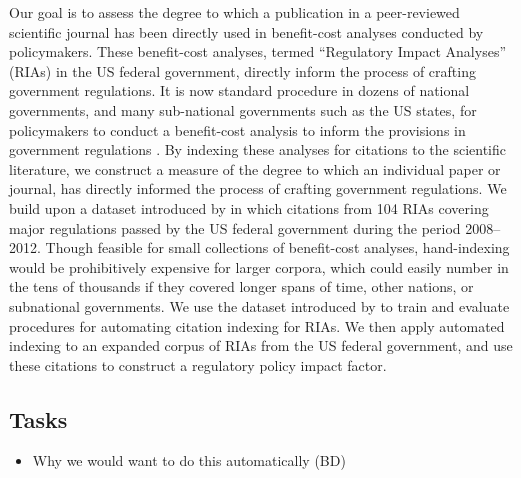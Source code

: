 \documentclass[12pt]{article}
\begin{document}
Our goal is to assess the degree to which a publication in a peer-reviewed scientific journal has been directly used in benefit-cost analyses conducted by policymakers. These benefit-cost analyses, termed ``Regulatory Impact Analyses'' (RIAs) in the US federal government, directly inform the process of crafting government regulations. It is now standard procedure in dozens of national governments, and many sub-national governments such as the US states, for policymakers to conduct a benefit-cost analysis to inform the provisions in government regulations \cite{hahn2007}. By indexing these analyses for citations to the scientific literature, we construct a measure of the degree to which an individual paper or journal, has directly informed the process of crafting government regulations. We build upon a dataset introduced by \cite{desmarais2014} in which citations from 104 RIAs covering major regulations passed by the US federal government during the period 2008--2012. Though feasible for small collections of benefit-cost analyses, hand-indexing would be prohibitively expensive for larger corpora, which could easily number in the tens of thousands if they covered longer spans of time, other nations, or subnational governments. We use the dataset introduced by \cite{desmarais2014} to train and evaluate procedures for automating citation indexing for RIAs. We then apply automated indexing to an expanded corpus of RIAs from the US federal government, and use these citations to construct a regulatory policy impact factor.

\subsection{Tasks}

\begin{itemize}
\item Why we would want to do this automatically (BD)


\end{itemize}
\end{document}
